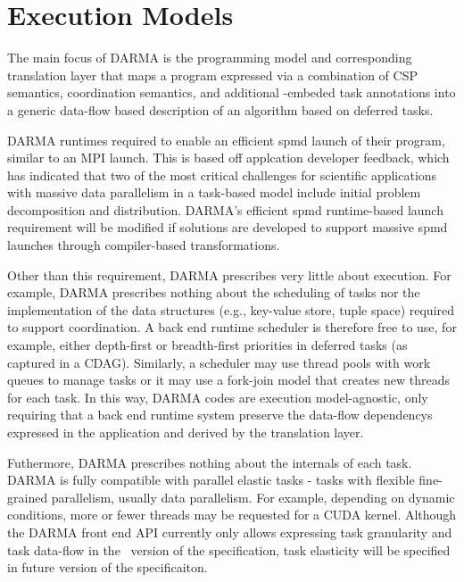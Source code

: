 

\section{Execution Models}
\label{sec:exec_model}
The main focus of \gls{DARMA} is the \gls{programming model} and corresponding
\gls{translation layer} that maps a program expressed via a combination of
\gls{CSP} semantics, \gls{coordination semantics}, and additional \CC{}-embeded task annotations into a generic data-flow based
description of an algorithm based on \gls{deferred tasks}.

\gls{DARMA} runtimes required to enable an efficient
\gls{spmd} launch of their program, similar to an MPI launch.
This is based off applcation developer feedback, which has indicated that 
two of the most critical challenges for scientific applications with massive data parallelism in a task-based model
include initial problem decomposition and distribution.
\gls{DARMA}'s efficient \gls{spmd} runtime-based launch requirement 
will be modified if solutions are developed to support massive \gls{spmd} launches
through compiler-based transformations.

Other than this requirement, \gls{DARMA} prescribes very little
about execution.
For example, \gls{DARMA} prescribes nothing about the scheduling of tasks nor the implementation 
of the data structures (e.g., \gls{key-value store}, \gls{tuple space}) required to support coordination.
A \gls{back end} \gls{runtime} scheduler is therefore free to use, for example,
either depth-first or breadth-first priorities in deferred tasks (as captured
in a \gls{CDAG}).
Similarly, a scheduler may use \gls{thread pools} with work queues to manage
tasks or it may use a \gls{fork-join} model that creates new threads for each task.
In this way, \gls{DARMA} codes are \gls{execution model}-agnostic, only
requiring that a \gls{back end} \gls{runtime system} preserve the
\glspl{data-flow dependency} expressed in the application and derived by the
\gls{translation layer}.

Futhermore, \gls{DARMA} prescribes nothing about the internals of each task.
\gls{DARMA} is fully compatible with parallel elastic tasks - tasks with
flexible fine-grained parallelism, usually \gls{data parallelism}.
For example, depending on dynamic conditions, more or fewer threads may be
requested for a \gls{CUDA} kernel.
Although the \gls{DARMA} \gls{front end} \gls{API} currently only allows
expressing task granularity and task data-flow in the \specVersion\ version of
the specification, task elasticity will be specified in future version of the
specificaiton.


